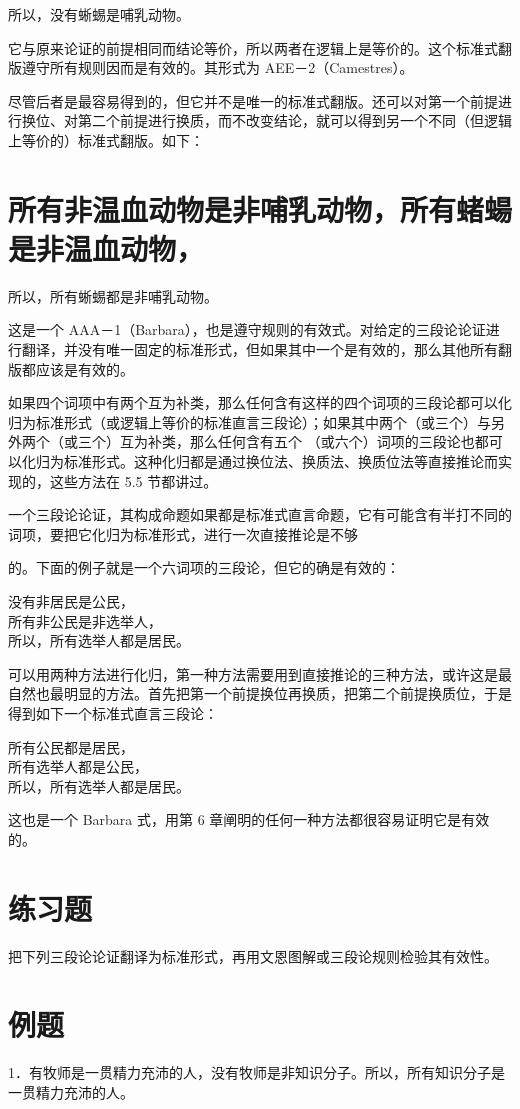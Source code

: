 所以，没有蜥蜴是哺乳动物。

它与原来论证的前提相同而结论等价，所以两者在逻辑上是等价的。这个标准式翻版遵守所有规则因而是有效的。其形式为 AEE－2（Camestres）。

尽管后者是最容易得到的，但它并不是唯一的标准式翻版。还可以对第一个前提进行换位、对第二个前提进行换质，而不改变结论，就可以得到另一个不同（但逻辑上等价的）标准式翻版。如下：

\section*{所有非温血动物是非哺乳动物，所有蝫蝪是非温血动物，}
所以，所有蜥蜴都是非哺乳动物。

这是一个 AAA－1（Barbara），也是遵守规则的有效式。对给定的三段论论证进行翻译，并没有唯一固定的标准形式，但如果其中一个是有效的，那么其他所有翻版都应该是有效的。

如果四个词项中有两个互为补类，那么任何含有这样的四个词项的三段论都可以化归为标准形式（或逻辑上等价的标准直言三段论）；如果其中两个（或三个）与另外两个（或三个）互为补类，那么任何含有五个 （或六个）词项的三段论也都可以化归为标准形式。这种化归都是通过换位法、换质法、换质位法等直接推论而实现的，这些方法在 5.5 节都讲过。

一个三段论论证，其构成命题如果都是标准式直言命题，它有可能含有半打不同的词项，要把它化归为标准形式，进行一次直接推论是不够

的。下面的例子就是一个六词项的三段论，但它的确是有效的：

没有非居民是公民，\\
所有非公民是非选举人，\\
所以，所有选举人都是居民。

可以用两种方法进行化归，第一种方法需要用到直接推论的三种方法，或许这是最自然也最明显的方法。首先把第一个前提换位再换质，把第二个前提换质位，于是得到如下一个标准式直言三段论：

所有公民都是居民，\\
所有选举人都是公民，\\
所以，所有选举人都是居民。

这也是一个 Barbara 式，用第 6 章阐明的任何一种方法都很容易证明它是有效的。

\section*{练习题}
把下列三段论论证翻译为标准形式，再用文恩图解或三段论规则检验其有效性。

\section*{例题}
1．有牧师是一贯精力充沛的人，没有牧师是非知识分子。所以，所有知识分子是一贯精力充沛的人。

